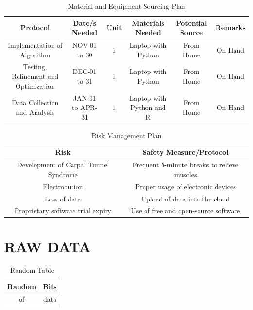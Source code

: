 \documentclass{strrespaper-trad}
\begin{document}
\begin{landscape}
			\begin{table}[htbp]
				\centering
				\caption{Material and Equipment Sourcing Plan}
				\label{tab:material_equipment_sourcing}
				\begin{tabular}{cccccc}
					\toprule
					Protocol                             & Date/s Needed    & Unit & Materials Needed         & Potential Source & Remarks \\
					\midrule
					Implementation of Algorithm          & NOV-01 to 30     & 1    & Laptop with Python       & From Home        & On Hand \\
					Testing, Refinement and Optimization & DEC-01 to 31     & 1    & Laptop with Python       & From Home        & On Hand \\
					Data Collection and Analysis         & JAN-01 to APR-31 & 1    & Laptop with Python and R & From Home        & On Hand \\
					\bottomrule
				\end{tabular}
			\end{table}

			\begin{table}[htbp]
				\centering
				\caption{Risk Management Plan}
				\label{tab:risk_management}
				\begin{tabularx}{\textwidth}{cc}
					\toprule
					Risk                                  & Safety Measure/Protocol                     \\
					\midrule
					Development of Carpal Tunnel Syndrome & Frequent 5-minute breaks to relieve muscles \\
					Electrocution                         & Proper usage of electronic devices          \\
					Loss of data                          & Upload of data into the cloud               \\
					Proprietary software trial expiry     & Use of free and open-source software        \\
					\bottomrule
				\end{tabularx}
			\end{table}
		\end{landscape}

	\chapter{RAW DATA}
		\begin{table}[htbp]
			\centering
			\caption{Random Table}
			\label{tab:random}
			\begin{tabular}{cc}
				\toprule
				Random & Bits \\
				\midrule
				of     & data \\
				\bottomrule
			\end{tabular}
		\end{table}
		\lstset{language=Python, breaklines=true, numbers=left, stringstyle=\ttfamily\small, basicstyle=\singlespacing}
\end{document}
